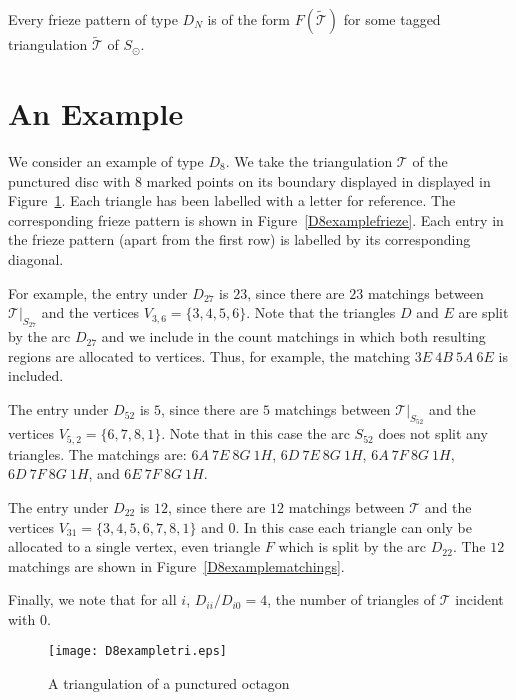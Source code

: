 \documentclass[a4paper]{amsart}
\begin{document}
\begin{conjecture}
Every frieze pattern of type $D_N$ is of the form $F(\widetilde{\mathcal T})$ for
some tagged triangulation $\widetilde{\mathcal T}$ of $S_{\odot}$.
\end{conjecture}

\section{An Example}
\label{sec:example}

We consider an example of type $D_8$. We take the triangulation ${\mathcal T}$ of
the punctured disc with $8$ marked points on its boundary displayed in
displayed in Figure~\ref{D8exampletri}. Each triangle has been
labelled with a letter for reference. The corresponding frieze
pattern is shown in Figure~\ref{D8examplefrieze}.
Each entry in the frieze pattern (apart from the first row) is labelled by
its corresponding diagonal.

For example, the entry under $D_{27}$ is $23$, since there are $23$ matchings
between ${\mathcal T}|_{S_{27}}$ and the vertices $V_{3,6}=\{3,4,5,6\}$.
Note that the triangles $D$ and $E$ are split by the arc $D_{27}$ and
we include in the count matchings in which both resulting regions are
allocated to vertices. Thus, for example, the matching
$3E\ 4B\ 5A\ 6E$ is included.

The entry under $D_{52}$ is $5$, since there are $5$ matchings
between ${\mathcal T}|_{S_{52}}$ and the vertices $V_{5,2}=\{6,7,8,1\}$.
Note that in this case the arc $S_{52}$ does not split any triangles.
The matchings are:
$6A\ 7E\ 8G\ 1H$, $6D\ 7E\ 8G\ 1H$, $6A\ 7F\ 8G\ 1H$, $6D\ 7F\ 8G\ 1H$,
and $6E\ 7F\ 8G\ 1H$.

The entry under $D_{22}$ is $12$, since there are $12$ matchings between
${\mathcal T}$ and the vertices $V_{31}=\{3,4,5,6,7,8,1\}$ and $0$.
In this case each triangle can only be allocated to a single vertex, even
triangle $F$ which is split by the arc $D_{22}$.
The $12$ matchings are shown in Figure~\ref{D8examplematchings}.

Finally, we note that for all $i$, $D_{ii}/D_{i0}=4$, the number of
triangles of ${\mathcal T}$ incident with $0$.

\begin{figure}
\begin{center}
\texttt{[image: D8exampletri.eps]}
\caption{A triangulation of a punctured octagon}
\label{D8exampletri}
\end{center}
\end{figure}
\end{document}
